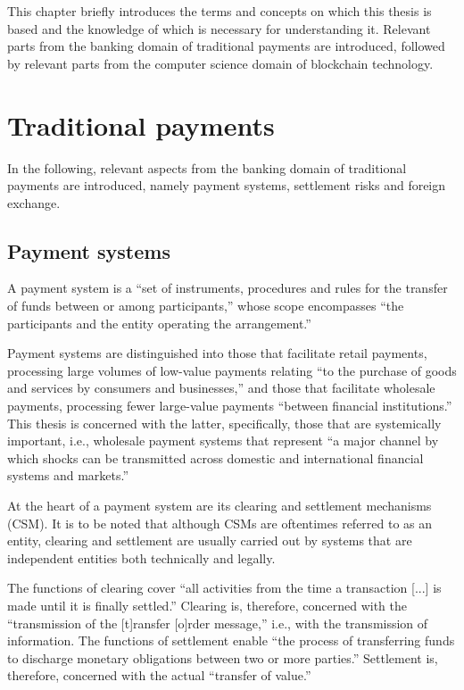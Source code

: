 This chapter briefly introduces the terms and concepts on which this thesis is based and the knowledge of which is necessary for understanding it.
Relevant parts from the banking domain of traditional payments are introduced, followed by relevant parts from the computer science domain of blockchain technology.

\section{Traditional payments}

In the following, relevant aspects from the banking domain of traditional payments are introduced, namely payment systems, settlement risks and foreign exchange.

\subsection{Payment systems}

A payment system is a ``set of instruments, procedures and rules for the transfer of funds between or among participants,'' whose scope encompasses ``the participants and the entity operating the arrangement.'' \autocite[13]{cpmi2016}

Payment systems are distinguished into those that facilitate retail payments, processing large volumes of low-value payments relating ``to the purchase of goods and services by consumers and businesses,'' and those that facilitate wholesale payments, processing fewer large-value payments ``between financial institutions.'' \autocite[22]{bech2020}
This thesis is concerned with the latter, specifically, those that are systemically important, i.e., wholesale payment systems that represent ``a major channel by which shocks can be transmitted across domestic and international financial systems and markets.'' \autocite[1]{cpmi2001}

At the heart of a payment system are its clearing and settlement mechanisms (CSM).
It is to be noted that although CSMs are oftentimes referred to as an entity, clearing and settlement are usually carried out by systems that are independent entities both technically and legally.

The functions of clearing cover ``all activities from the time a transaction [...] is made until it is finally settled.'' \autocite[6]{loeber2006}
Clearing is, therefore, concerned with the ``transmission of the [t]ransfer [o]rder message,'' \autocite[21]{vereecken2003} i.e., with the transmission of information.
The functions of settlement enable ``the process of transferring funds to discharge monetary obligations between two or more parties.'' \autocite[23]{bech2020}
Settlement is, therefore, concerned with the actual ``transfer of value.'' \autocite[21]{vereecken2003}

